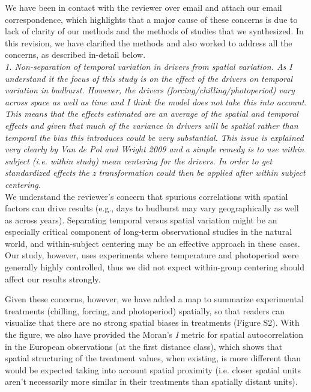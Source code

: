 \documentclass{article}
\begin{document}
We have been in contact with the reviewer over email and attach our email correspondence, which highlights that a major cause of these concerns is due to lack of clarity of our methods and the methods of studies that we synthesized. In this revision, we have clarified the methods and also worked to address all the concerns, as described in-detail below.\\

\emph{1. Non-separation of temporal variation in drivers from spatial variation. As I understand it the
focus of this study is on the effect of the drivers on temporal variation in budburst. However,
the drivers (forcing/chilling/photoperiod) vary across space as well as time and I think the
model does not take this into account. This means that the effects estimated are an average of
the spatial and temporal effects and given that much of the variance in drivers will be spatial
rather than temporal the bias this introduces could be very substantial. This issue is explained
very clearly by Van de Pol and Wright 2009 and a simple remedy is to use within subject (i.e.
within study) mean centering for the drivers. In order to get standardized effects the z
transformation could then be applied after within subject centering.}\\

We understand the reviewer's concern that spurious correlations with spatial factors can drive results (e.g., days to budburst may vary geographically as well as across years). Separating temporal versus spatial variation might be an especially critical component of long-term observational studies in the natural world, and within-subject centering may be an effective approach in these cases. Our study, however, uses experiments where temperature and photoperiod were generally highly controlled, thus we did not expect within-group centering should affect our results strongly. 

Given these concerns, however, we have added a map to summarize experimental treatments (chilling, forcing, and photoperiod) spatially, so that readers can visualize that there are no strong spatial biases in treatments (Figure S2). With the figure, we also have provided the Moran's \emph{I} metric for spatial autocorrelation in the European observations (at the first distance class), which shows that spatial structuring of the treatment values, when existing, is more different than would be expected taking into account spatial proximity (i.e. closer spatial units aren't necessarily more similar in their treatments than spatially distant units). 
\end{document}
